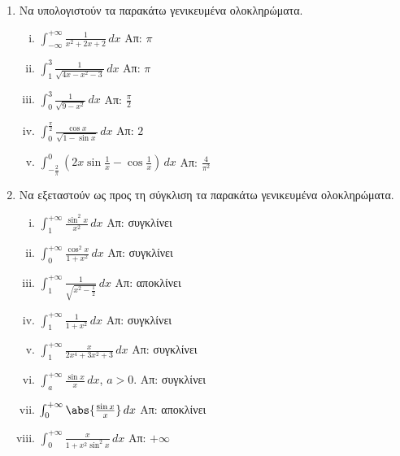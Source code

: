 


\everymath{\displaystyle}



\begin{center}
\end{center}

\vspace{\baselineskip}

\begin{enumerate}
	\item Να υπολογιστούν τα παρακάτω γενικευμένα ολοκληρώματα.

		\begin{enumerate}[i)]
			\item $ \int _{-\infty}^{+\infty} \frac{1}{x^{2}+2x+2} \,{dx} $
				\hfill Απ: $ \pi $
			\item $ \int _{1}^{3} \frac{1}{\sqrt{4x-x^{2}-3}} \,{dx} $ \hfill
				Απ: $ \pi $
			\item $ \int _{0}^{3} \frac{1}{\sqrt{9-x^{2}}} \,{dx} $ \hfill Απ: $
				\frac{\pi}{2} $
			\item $ \int _{0}^{\frac{\pi}{2}} \frac{\cos{x}}{\sqrt{1 - \sin{x}}}\,{dx} $
				\hfill Απ: $ 2 $
			\item $ \int_{-\frac{2}{\pi}}^{0} \left(2x \sin{\frac{1}{x}} - 
				\cos{\frac{1}{x}}\right) \,{dx} $ \hfill Απ: $ \frac{4}{\pi ^{2}} $
		\end{enumerate}

	\item Να εξεταστούν ως προς τη σύγκλιση τα παρακάτω γενικευμένα
		ολοκληρώματα.

		\begin{enumerate}[i)]
			\item $ \int_{1}^{+\infty} \frac{\sin^{2}{x}}{x^{2}} \,{dx} $ 
                \hfill Απ: συγκλίνει
			\item $ \int _{0}^{+\infty} \frac{\cos^{2}{x}}{1+x^{2}} \,{dx} $
				\hfill Απ: συγκλίνει
			\item $ \int_{1}^{+\infty} \frac{1}{\sqrt{x^{2} - \frac{1}{2}}} \,{dx}  $
				\hfill Απ: αποκλίνει
			\item $ \int_{1}^{+\infty} \frac{1}{1+x^{2}} \,{dx} $ \hfill Απ: συγκλίνει
			\item $ \int _{1}^{+\infty} \frac{x}{2x^{4}+3x^{2}+3} \,{dx} $
				\hfill Απ: συγκλίνει
			\item $ \int _{a}^{+\infty} \frac{\sin{x}}{x} \,{dx}$, $ a>0 $.
				\hfill Απ: συγκλίνει
			\item $ \int _{0}^{+\infty}	\abs{\frac{\sin{x}}{x}} \,{dx} $ \hfill
				Απ: αποκλίνει
			\item $ \int _{0}^{+\infty} \frac{x}{1+x^{2} \sin^{2}{x}}  \,{dx} $
				\hfill Απ: $ +\infty $
		\end{enumerate}


\end{enumerate}
